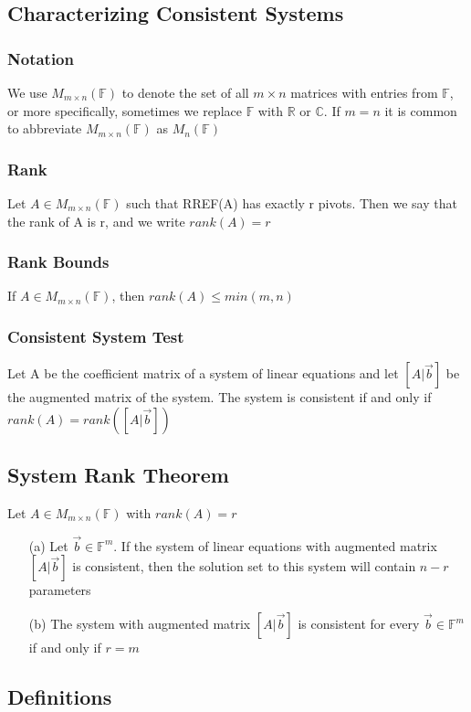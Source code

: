 \documentclass[12pt, letterpaper]{article}
\begin{document}
\subsection{Characterizing Consistent Systems}
\subsubsection{Notation}
We use $M_{m\times n}(\mathbb{F})$ to denote the set of all $m\times n$ matrices with entries from $\mathbb{F}$, 
or more specifically, sometimes we replace $\mathbb{F}$ with $\mathbb{R}$ or $\mathbb{C}$. If $m=n$ it is common 
to abbreviate $M_{m\times n}(\mathbb{F})$ as $M_n(\mathbb{F})$
\subsubsection{Rank}
Let $A\in M_{m\times n}(\mathbb{F})$ such that RREF(A) has exactly r pivots. Then we say that the rank of A is r, and we write $rank(A) = r$
\subsubsection{Rank Bounds}
If $A\in M_{m\times n}(\mathbb{F})$, then $rank(A)\leq min(m,n)$
\subsubsection{Consistent System Test}
Let A be the coefficient matrix of a system of linear equations and let $[A|\vec{b}]$ be the augmented matrix of the system. 
The system is consistent if and only if $rank(A) = rank([A|\vec{b}])$
\subsection{System Rank Theorem}
Let $A\in M_{m\times n}(\mathbb{F})$ with $rank(A) = r$
\begin{itemize}
    \item[(a)] Let $\vec{b}\in\mathbb{F}^m$. If the system of linear equations with augmented matrix $[A|\vec{b}]$ is consistent, then the solution set to this system will contain $n-r$ parameters 
    \item[(b)] The system with augmented matrix $[A|\vec{b}]$ is consistent for every $\vec{b}\in\mathbb{F}^m$ if and only if $r=m$
\end{itemize}
\subsection{Definitions}
\end{document}
